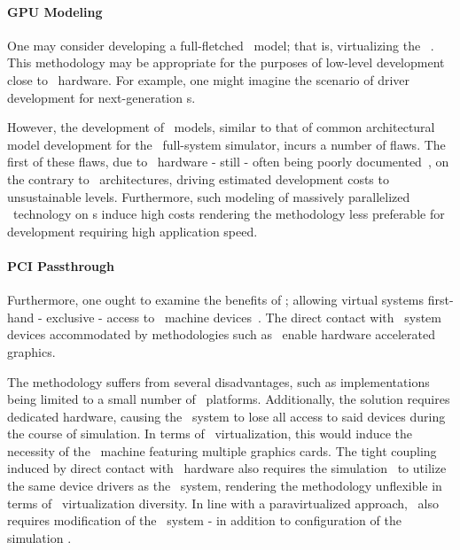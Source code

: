 \paragraph{GPU Modeling}
\label{par:backgroundandrelatedwork_graphicsvirtualization_gpumodeling}
One may consider developing a full-fletched \dvttermgpu\ model; that is, virtualizing the \dvttermgpu\ \dvttermisa .
This methodology may be appropriate for the purposes of low-level development close to \dvttermgpu\ hardware.
For example, one might imagine the scenario of driver development for next-generation \dvttermgpu s.

However, the development of \dvttermgpu\ models, similar to that of common architectural model development for the \dvttermsimics\ full-system simulator, incurs a number of flaws.
The first of these flaws, due to \dvttermgpu\ hardware - still - often being poorly documented~, on the contrary to \dvttermcpu\ architectures, driving estimated development costs to unsustainable levels.
Furthermore, such modeling of massively parallelized \dvttermgpu\ technology on \dvttermcpu s induce high costs rendering the methodology less preferable for development requiring high application speed.

\paragraph{PCI Passthrough}
\label{par:backgroundandrelatedwork_graphicsvirtualization_pcipassthrough}
Furthermore, one ought to examine the benefits of \dvttermpcipassthrough ; allowing virtual systems first-hand - exclusive - access to \dvttermhost\ machine devices~.
The direct contact with \dvttermhost\ system devices accommodated by methodologies such as \dvttermpcipassthrough\ enable hardware accelerated graphics.

The methodology suffers from several disadvantages, such as implementations being limited to a small number of \dvttermlinux\ platforms.
Additionally, the solution requires dedicated hardware, causing the \dvttermhost\ system to lose all access to said devices during the course of simulation.
In terms of \dvttermgpu\ virtualization, this would induce the necessity of the \dvttermhost\ machine featuring multiple graphics cards.
The tight coupling induced by direct contact with \dvttermhost\ hardware also requires the simulation \dvttermtarget\ to utilize the same device drivers as the \dvttermhost\ system, rendering the methodology unflexible in terms of \dvttermgpu\ virtualization diversity.
In line with a paravirtualized approach, \dvttermpcipassthrough\ also requires modification of the \dvttermtarget\ system - in addition to configuration of the simulation \dvttermhost .

